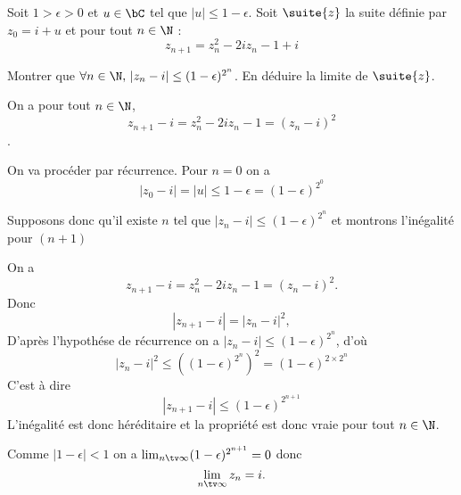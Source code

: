 




\begin{exercice}
Soit $1>\epsilon >0$ et $u\in \bC$ tel que $|u| \leq 1-\epsilon$.
Soit $\suite{z}$ la suite définie par $z_0= i+u$ et pour tout $n\in \N$ :
$$z_{n+1} = z_n^2 -2iz_n-1+i$$

Montrer que $\forall n\in \N,\, |z_n-i|\leq (1-\epsilon)^{2^n}$. En déduire la limite de $\suite{z}$.
\end{exercice}

\begin{correction}
On a pour tout $n\in \N$, 
$$z_{n+1} -i =z_n^2 -2iz_n-1= (z_n-i)^2$$. 

On va procéder par récurrence. Pour $n=0$ on a 
$$|z_0-i |=|u| \leq 1-\epsilon =(1-\epsilon)^{2^0}$$

Supposons donc qu'il existe $n$ tel que $|z_n-i|\leq (1-\epsilon)^{2^n}$  et montrons l'inégalité pour $(n+1)$


On a $$z_{n+1} - i = z_n^2-2iz_n-1 = (z_n -i)^2.$$
Donc 
$$|z_{n+1} - i | =| z_n -i|^2,$$
D'après l'hypothése de récurrence on a 
$| z_n -i| \leq (1-\epsilon)^{2^n}$, d'où
$$| z_n -i|^2 \leq \left((1-\epsilon)^{2^n}\right)^2 =(1-\epsilon)^{2\times 2^{n}}$$
C'est à dire 
$$|z_{n+1} - i | \leq (1-\epsilon)^{2^{n+1}}$$
L'inégalité est donc héréditaire et la propriété est donc vraie pour tout $n\in \N$.

Comme $|1-\epsilon|<1$ on a $\lim_{n\tv \infty}  (1-\epsilon)^{2^{n+1}}=0$ donc 
$$\lim_{n\tv \infty}  z_n = i.$$




\end{correction}